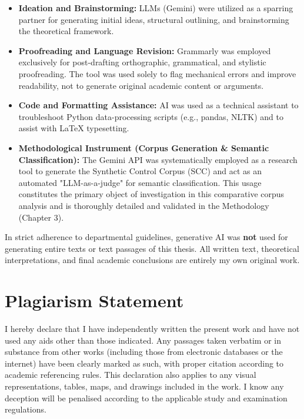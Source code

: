 \begin{itemize}
    \item \textbf{Ideation and Brainstorming:} LLMs (Gemini) were utilized as a sparring partner for generating initial ideas, structural outlining, and brainstorming the theoretical framework.
    \item \textbf{Proofreading and Language Revision:} Grammarly was employed exclusively for post-drafting orthographic, grammatical, and stylistic proofreading. The tool was used solely to flag mechanical errors and improve readability, not to generate original academic content or arguments.
    \item \textbf{Code and Formatting Assistance:} AI was used as a technical assistant to troubleshoot Python data-processing scripts (e.g., pandas, NLTK) and to assist with LaTeX typesetting.
    \item \textbf{Methodological Instrument (Corpus Generation \& Semantic Classification):} The Gemini API was systematically employed as a research tool to generate the Synthetic Control Corpus (SCC) and act as an automated "LLM-as-a-judge" for semantic classification. This usage constitutes the primary object of investigation in this comparative corpus analysis and is thoroughly detailed and validated in the Methodology (Chapter 3).
\end{itemize}

\vspace{1em}
\noindent In strict adherence to departmental guidelines, generative AI was \textbf{not} used for generating entire texts or text passages of this thesis. All written text, theoretical interpretations, and final academic conclusions are entirely my own original work.

\newpage
\section*{Plagiarism Statement}

I hereby declare that I have independently written the present work and have not used any aids other than those indicated. Any passages taken verbatim or in substance from other works (including those from electronic databases or the internet) have been clearly marked as such, with proper citation according to academic referencing rules. This declaration also applies to any visual representations, tables, maps, and drawings included in the work. I know any deception will be penalised according to the applicable study and examination regulations.

